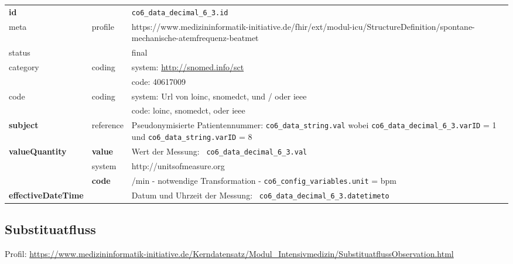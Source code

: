 \begin{longtable}{|l|l|p{7.5cm}|}
        \hline
        \rowcolor{lightgray} \multicolumn{3}{|l|}{Data Mapping (inhaltlich)} \\ \hline
        \textbf{id} &  & \texttt{co6\_data\_decimal\_6\_3.id} \\ \hline
	meta & profile & https://www.medizininformatik-initiative.de/fhir/ext/modul-icu/StructureDefinition/spontane-mechanische-atemfrequenz-beatmet \\ \hline 
	status &  & final   \\ \hline 
	category & coding & system: \url{http://snomed.info/sct} \\
\cline{3-3}
	& & code: 40617009 \\ \hline
	code & coding & system: Url von \ac{loinc}, \ac{snomedct}, und / oder \ac{ieee} \\ 
	\cline{3-3} 
	 &  & code: \ac{loinc}, \ac{snomedct}, oder \ac{ieee} \\ \hline
	 \textbf{subject} & reference & Pseudonymisierte Patientennummer: \texttt{co6\_data\_string.val} wobei \texttt{co6\_data\_decimal\_6\_3.varID} = 1 und \texttt{co6\_data\_string.varID} = 8 \\ \hline
	 \textbf{valueQuantity}  & \textbf{value} & Wert der Messung: \texttt{
co6\_data\_decimal\_6\_3.val} \\
        \cline{2-3}
         & system & http://unitsofmeasure.org \\
         \cline{2-3}
         & \textbf{code} & /min - notwendige Transformation - \texttt{co6\_config\_variables.unit} = bpm \\ \hline
     \textbf{effectiveDateTime}  & & Datum und Uhrzeit der Messung: \texttt{
co6\_data\_decimal\_6\_3.datetimeto} \\ \hline
\end{longtable}


\subsection{Substituatfluss} 
 Profil: \url{https://www.medizininformatik-initiative.de/Kerndatensatz/Modul_Intensivmedizin/SubstituatflussObservation.html}

